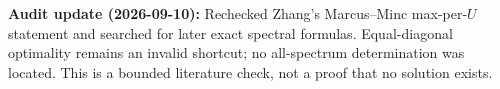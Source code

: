 \documentclass[11pt,a4paper]{article}
\begin{document}
\textbf{Audit update (2026-09-10):} Rechecked Zhang's Marcus--Minc
max-per-\(U\) statement and searched for later exact spectral formulas.
Equal-diagonal optimality remains an invalid shortcut; no all-spectrum
determination was located. This is a bounded literature check, not a
proof that no solution exists.
\end{document}
